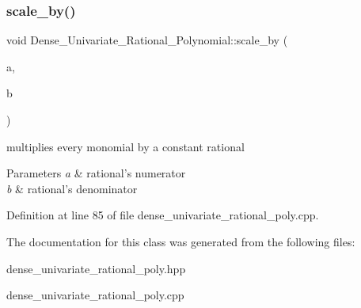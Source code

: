 \mbox{\label{class_dense___univariate___rational___polynomial_a75113519785d8fba7d957b630bd26a54}} 
\subsubsection{\texorpdfstring{scale\+\_\+by()}{scale\_by()}}
{\footnotesize\ttfamily void Dense\+\_\+\+Univariate\+\_\+\+Rational\+\_\+\+Polynomial\+::scale\+\_\+by (\begin{DoxyParamCaption}\item[{C\+O\+E\+F\+\_\+\+T\+Y\+PE}]{a,  }\item[{U\+C\+O\+E\+F\+\_\+\+T\+Y\+PE}]{b }\end{DoxyParamCaption})}



multiplies every monomial by a constant rational 


\begin{DoxyParams}{Parameters}
{\em a} & rational's numerator \\
\hline
{\em b} & rational's denominator \\
\hline
\end{DoxyParams}


Definition at line 85 of file dense\+\_\+univariate\+\_\+rational\+\_\+poly.\+cpp.



The documentation for this class was generated from the following files\+:\begin{DoxyCompactItemize}
\item 
dense\+\_\+univariate\+\_\+rational\+\_\+poly.\+hpp\item 
dense\+\_\+univariate\+\_\+rational\+\_\+poly.\+cpp\end{DoxyCompactItemize}

